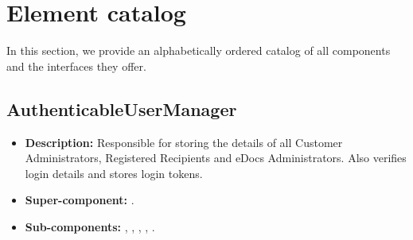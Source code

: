 \section{Element catalog}\label{app:catalog}
In this section, we provide an alphabetically ordered catalog of all components and the interfaces they offer.

\subsection{AuthenticableUserManager}
\begin{itemize}
    \item \textbf{Description:} Responsible for storing the details of all Customer Administrators, Registered Recipients and eDocs Administrators. Also verifies login details and stores login tokens.
    \item \textbf{Super-component:} .
    \item \textbf{Sub-components:} , , , , .
\end{itemize}


